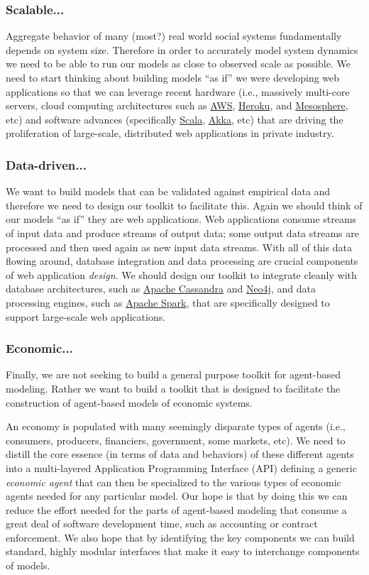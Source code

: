 \documentclass[11pt]{amsart}
\begin{document}
\subsubsection{Scalable...}
Aggregate behavior of many (most?) real world social systems fundamentally depends on system size. Therefore in order to accurately model system dynamics we need to be able to run our models as close to observed scale as possible. We need to start thinking about building models ``as if'' we were developing web applications so that we can leverage recent hardware (i.e., massively multi-core servers, cloud computing architectures such as \href{http://aws.amazon.com/}{AWS}, \href{https://www.heroku.com/}{Heroku}, and \href{https://mesosphere.com/}{Mesosphere}, etc) and software advances (specifically \href{http://www.scala-lang.org/}{Scala}, \href{http://akka.io/}{Akka}, etc) that are driving the proliferation of large-scale, distributed web applications in private industry.

\subsubsection{Data-driven...}
We want to build models that can be validated against empirical data and therefore we need to design our toolkit to facilitate this.  Again we should think of our models ``as if'' they are web applications. Web applications consume streams of input data and produce streams of output data; some output data streams are processed and then used again as new input data streams. With all of this data flowing around, database integration and data processing are crucial components of web application \textit{design}. We should design our toolkit to integrate cleanly with database architectures, such as \href{http://cassandra.apache.org/}{Apache Cassandra} and \href{http://neo4j.com/}{Neo4j}, and data processing engines, such as \href{http://spark.apache.org/}{Apache Spark}, that are specifically designed to support large-scale web applications.

\subsubsection{Economic...}
Finally, we are not seeking to build a general purpose toolkit for agent-based modeling. Rather we want to build a toolkit that is designed to facilitate the construction of agent-based models of economic systems.

An economy is populated with many seemingly disparate types of agents (i.e., consumers, producers, financiers, government, some markets, etc). We need to distill the core essence (in terms of data and behaviors) of these different agents into a multi-layered Application Programming Interface (API) defining a generic \textit{economic agent} that can then be specialized to the various types of economic agents needed for any particular model. Our hope is that by doing this we can reduce the effort needed for the parts of agent-based modeling that consume a great deal of software development time, such as accounting or contract enforcement.  We also hope that by identifying the key components we can build standard, highly modular interfaces that make it easy to interchange components of models.
\end{document}
